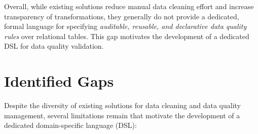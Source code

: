 Overall, while existing solutions reduce manual data cleaning effort and increase transparency of transformations, they generally do not provide a dedicated, formal language for specifying \emph{auditable, reusable, and declarative data quality rules} over relational tables. 
This gap motivates the development of a dedicated DSL for data quality validation.




\section{Identified Gaps}

Despite the diversity of existing solutions for data cleaning and data quality management, several limitations remain that motivate the development of a dedicated domain-specific language (DSL):

